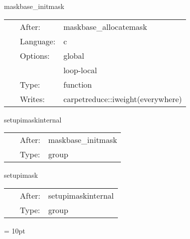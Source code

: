 \hspace{5mm} maskbase\_initmask 

\hspace{5mm}{\it initialise the weight function } 


\hspace{5mm}

 \begin{tabular*}{160mm}{cll} 
~ & After:  & maskbase\_allocatemask \\ 
~ & Language:  & c \\ 
~ & Options:  & global \\ 
~& ~ &loop-local\\ 
~ & Type:  & function \\ 
~ & Writes:  & carpetreduce::iweight(everywhere) \\ 
\end{tabular*} 


\vspace{5mm}


\hspace{5mm} setupimaskinternal 

\hspace{5mm}{\it set up the integer weight function (schedule other routines in here) } 


\hspace{5mm}

 \begin{tabular*}{160mm}{cll} 
~ & After:  & maskbase\_initmask \\ 
~ & Type:  & group \\ 
\end{tabular*} 


\vspace{5mm}


\hspace{5mm} setupimask 

\hspace{5mm}{\it set up the integer weight function (schedule other routines in here) } 


\hspace{5mm}

 \begin{tabular*}{160mm}{cll} 
~ & After:  & setupimaskinternal \\ 
~ & Type:  & group \\ 
\end{tabular*} 



\vspace{5mm}\parskip = 10pt 

